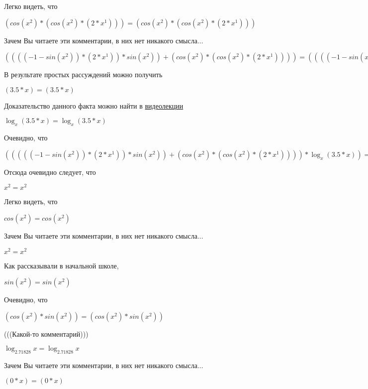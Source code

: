 \documentclass[12pt,a4paper,fleqn]{article}
\theoremstyle{definition}
\begin{document}
Легко видеть, что

$(cos({ x }^{ 2 }) * (cos({ x }^{ 2 }) * ( 2  * { x }^{ 1 }))) = (cos({ x }^{ 2 }) * (cos({ x }^{ 2 }) * ( 2  * { x }^{ 1 })))$

Зачем Вы читаете эти комментарии, в них нет никакого смысла...

$(((( -1  - sin({ x }^{ 2 })) * ( 2  * { x }^{ 1 })) * sin({ x }^{ 2 })) + (cos({ x }^{ 2 }) * (cos({ x }^{ 2 }) * ( 2  * { x }^{ 1 })))) = (((( -1  - sin({ x }^{ 2 })) * ( 2  * { x }^{ 1 })) * sin({ x }^{ 2 })) + (cos({ x }^{ 2 }) * (cos({ x }^{ 2 }) * ( 2  * { x }^{ 1 }))))$

В результате простых рассуждений можно получить

$( 3.5  *  x ) = ( 3.5  *  x )$

Доказательство данного факта можно найти в \href{https://www.youtube.com/watch?v=dQw4w9WgXcQ}{видеолекции}

$\log_{ x }{( 3.5  *  x )} = \log_{ x }{( 3.5  *  x )}$

Очевидно, что

$((((( -1  - sin({ x }^{ 2 })) * ( 2  * { x }^{ 1 })) * sin({ x }^{ 2 })) + (cos({ x }^{ 2 }) * (cos({ x }^{ 2 }) * ( 2  * { x }^{ 1 })))) * \log_{ x }{( 3.5  *  x )}) = ((((( -1  - sin({ x }^{ 2 })) * ( 2  * { x }^{ 1 })) * sin({ x }^{ 2 })) + (cos({ x }^{ 2 }) * (cos({ x }^{ 2 }) * ( 2  * { x }^{ 1 })))) * \log_{ x }{( 3.5  *  x )})$

Отсюда очевидно следует, что

${ x }^{ 2 } = { x }^{ 2 }$

Легко видеть, что

$cos({ x }^{ 2 }) = cos({ x }^{ 2 })$

Зачем Вы читаете эти комментарии, в них нет никакого смысла...

${ x }^{ 2 } = { x }^{ 2 }$

Как рассказывали в начальной школе,

$sin({ x }^{ 2 }) = sin({ x }^{ 2 })$

Очевидно, что

$(cos({ x }^{ 2 }) * sin({ x }^{ 2 })) = (cos({ x }^{ 2 }) * sin({ x }^{ 2 }))$

(((Какой-то комментарий)))

$\log_{ 2.71828 }{ x } = \log_{ 2.71828 }{ x }$

Зачем Вы читаете эти комментарии, в них нет никакого смысла...

$( 0  *  x ) = ( 0  *  x )$
\end{document}
